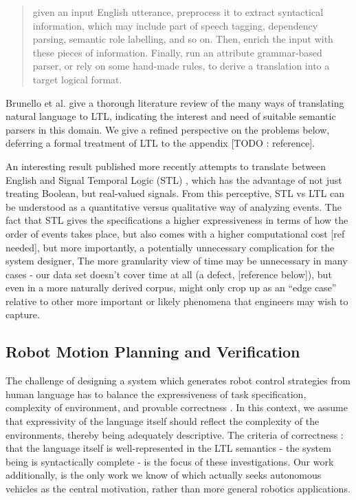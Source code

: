 \documentclass{article}
\begin{document}
\begin{quote}
given an input English utterance, preprocess it to extract syntactical information, which may
include part of speech tagging, dependency parsing, semantic role labelling, and so on. Then,
enrich the input with these pieces of information. Finally, run an attribute grammar-based
parser, or rely on some hand-made rules, to derive a translation into a target logical format.
\cite{brunello_et_al}
\end{quote}

Brunello et al. give a thorough literature review of the many ways of
translating natural language to LTL, indicating the interest and need of
suitable semantic parsers in this domain. We give a refined perspective on the
problems below, deferring a formal treatment of LTL to the appendix [TODO :
reference].

An interesting result published more recently attempts to translate between
English and Signal Temporal Logic (STL) \cite{he2021english}, which has the
advantage of not just treating Boolean, but real-valued signals. From this
perceptive, STL vs LTL can be understood as a quantitative versus qualitative
way of analyzing events. The fact that STL gives the specifications a higher
expressiveness in terms of how the order of events takes place, but also comes
with a higher computational cost [ref needed], but more importantly, a
potentially unnecessary complication for the system designer, The more
granularity view of time may be unnecessary in many cases - our data set doesn't
cover time at all (a defect, [reference below]), but even in a more naturally
derived corpus, might only crop up as an ``edge case'' relative to other more
important or likely phenomena that engineers may wish to capture.


\subsection{Robot Motion Planning and Verification}

The challenge of designing a system which generates robot control strategies
from human language has to balance the expressiveness of task specification,
complexity of environment, and provable correctness \cite{4141034}. In this
context, we assume that expressivity of the language itself should reflect the
complexity of the environments, thereby being adequately descriptive. The
criteria of correctness : that the language itself is well-represented in the
LTL semantics - the system being is syntactically complete - is the focus of
these investigations. Our work additionally, is the only work we know of which
actually seeks autonomous vehicles as the central motivation, rather than more
general robotics applications.
\end{document}
